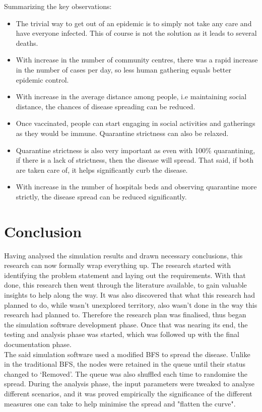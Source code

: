 \documentclass[conference]{IEEEtran}
\begin{document}
    \vspace{0.1in}
    Summarizing the key observations:
    \begin{itemize}
        \item The trivial way to get out of an epidemic is to simply not take any care and have everyone infected. This of course is not the solution as it leads to several deaths.
        \item With increase in the number of community centres, there was a rapid increase in the number of cases per day, so less human gathering equals better epidemic control.
        \item With increase in the average distance among people, i.e maintaining social distance, the chances of disease spreading can be reduced.
        \item Once vaccinated, people can start engaging in social activities and gatherings as they would be immune. Quarantine strictness can also be relaxed.
        \item Quarantine strictness is also very important as even with 100\% quarantining, if there is a lack of strictness, then the disease will spread. That said, if both are taken care of, it helps significantly curb the disease.
        \item With increase in the number of hospitals beds and observing quarantine more strictly, the disease spread can be reduced significantly.
    \end{itemize}
         
    \section{Conclusion}
        Having analysed the simulation results and drawn necessary conclusions, this research can now formally wrap everything up. The research started with identifying the problem statement and laying out the requirements. With that done, this research then went through the literature available, to gain valuable insights to help along the way. It was also discovered that what this research had planned to do, while wasn't unexplored territory, also wasn't done in the way this research had planned to. Therefore the research plan was finalised, thus began the simulation software development phase. Once that was nearing its end, the testing and analysis phase was started, which was followed up with the final documentation phase.\\

        The said simulation software used a modified BFS to spread the disease. Unlike in the traditional BFS, the nodes were retained in the queue until their status changed to `Removed'. The queue was also shuffled each time to randomise the spread. During the analysis phase, the input parameters were tweaked to analyse different scenarios, and it was proved empirically the significance of the different measures one can take to help minimise the spread and "flatten the curve".\\
\end{document}
